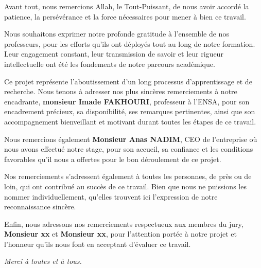 

Avant tout, nous remercions Allah, le Tout-Puissant, de nous avoir accordé la patience, la persévérance et la force nécessaires pour mener à bien ce travail.

Nous souhaitons exprimer notre profonde gratitude à l’ensemble de nos professeurs, pour les efforts qu’ils ont déployés tout au long de notre formation. Leur engagement constant, leur transmission de savoir et leur rigueur intellectuelle ont été les fondements de notre parcours académique.

Ce projet représente l’aboutissement d’un long processus d’apprentissage et de recherche. Nous tenons à adresser nos plus sincères remerciements à notre encadrante, \textbf{monsieur Imade FAKHOURI}, professeur à l’ENSA, pour son encadrement précieux, sa disponibilité, ses remarques pertinentes, ainsi que son accompagnement bienveillant et motivant durant toutes les étapes de ce travail.

Nous remercions également \textbf{Monsieur Anas NADIM}, CEO de l’entreprise où nous avons effectué notre stage, pour son accueil, sa confiance et les conditions favorables qu’il nous a offertes pour le bon déroulement de ce projet.

Nos remerciements s’adressent également à toutes les personnes, de près ou de loin, qui ont contribué au succès de ce travail. Bien que nous ne puissions les nommer individuellement, qu’elles trouvent ici l’expression de notre reconnaissance sincère.

Enfin, nous adressons nos remerciements respectueux aux membres du jury, \textbf{Monsieur xx} et \textbf{Monsieur xx}, pour l’attention portée à notre projet et l’honneur qu’ils nous font en acceptant d’évaluer ce travail.

\bigskip

\begin{flushright}
\textit{Merci à toutes et à tous.}
\end{flushright}




\clearpage